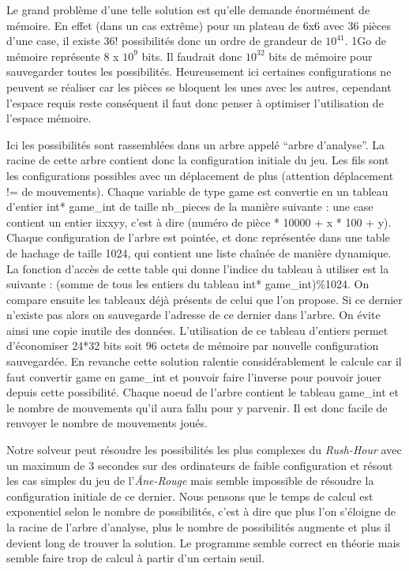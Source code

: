 \documentclass{report}
\begin{document}
Le grand problème d'une telle solution est qu'elle demande énormément de mémoire. En effet (dans un cas extrême) pour un plateau de 6x6 avec 36 pièces d'une case, il existe 36! possibilités donc un ordre de grandeur de $10^{41}$. 1Go de mémoire représente 8 x $10^9$ bits. Il faudrait donc $10^{32}$ bits de mémoire pour sauvegarder toutes les possibilités. Heureusement ici certaines configurations ne peuvent se réaliser car les pièces se bloquent les unes avec les autres, cependant l'espace requis reste conséquent il faut donc penser à optimiser l'utilisation de l'espace mémoire.

Ici les possibilités sont rassemblées dans un arbre appelé ``arbre d'analyse''. La racine de cette arbre contient donc la configuration initiale du jeu. Les fils sont les configurations possibles avec un déplacement de plus (attention déplacement != de mouvements). Chaque variable de type game est convertie en un tableau d'entier int* game\_int de taille nb\_pieces de la manière suivante : une case contient un entier iixxyy, c'est à dire (numéro de pièce * 10000 + x * 100 + y). Chaque configuration de l'arbre est pointée, et donc représentée dans une table de hachage de taille 1024, qui contient une liste chaînée de manière dynamique. La fonction d'accès de cette table qui donne l'indice du tableau à utiliser est la suivante : (somme de tous les entiers du tableau int* game\_int)\%1024. On compare ensuite les tableaux déjà présents de celui que l'on propose. Si ce dernier n'existe pas alors on sauvegarde l'adresse de ce dernier dans l'arbre. On évite ainsi une copie inutile des données. L'utilisation de ce tableau d'entiers permet d'économiser 24*32 bits soit 96 octets de mémoire par nouvelle configuration sauvegardée. En revanche cette solution ralentie considérablement le calcule car il faut convertir game en game\_int et pouvoir faire l'inverse pour pouvoir jouer depuis cette possibilité. Chaque noeud de l'arbre contient le tableau game\_int et le nombre de mouvements qu'il aura fallu pour y parvenir. Il est donc facile de renvoyer le nombre de mouvements joués.

Notre solveur peut résoudre les possibilités les plus complexes du \emph{Rush-Hour} avec un maximum de 3 secondes sur des ordinateurs de faible configuration et résout les cas simples du jeu de l'\emph{Âne-Rouge} mais semble impossible de résoudre la configuration initiale de ce dernier. Nous pensons que le temps de calcul est exponentiel selon le nombre de possibilités, c'est à dire que plus l'on s'éloigne de la racine de l'arbre d'analyse, plus le nombre de possibilités augmente et plus il devient long de trouver la solution. Le programme semble correct en théorie mais semble faire trop de calcul à partir d'un certain seuil.
	
\end{document}
